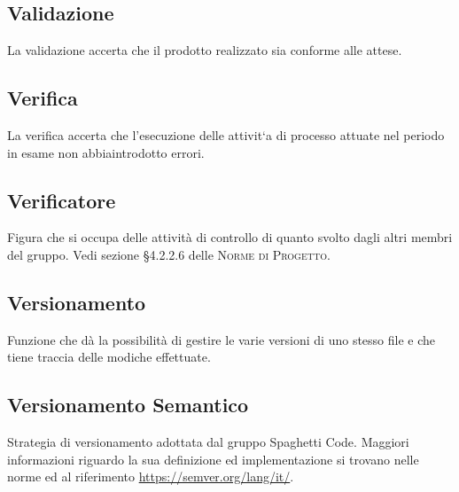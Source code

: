 \documentclass[../glossario.tex]{subfiles}
\begin{document}
\subsection*{Validazione}
{}
La validazione accerta che il prodotto realizzato sia conforme alle attese.

\subsection*{Verifica}
{}
La verifica accerta che l’esecuzione delle attivit`a di processo attuate nel periodo in esame non abbiaintrodotto errori.

\subsection*{Verificatore}
{}
Figura che si occupa delle attività di controllo di quanto svolto dagli altri membri del gruppo. Vedi sezione \S4.2.2.6 delle \textsc{Norme di Progetto}.

\subsection*{Versionamento}
{}
Funzione che dà la possibilità di gestire le varie versioni di uno stesso file e che tiene traccia delle modiche effettuate.

\subsection*{Versionamento Semantico}
{}
Strategia di versionamento adottata dal gruppo Spaghetti Code. Maggiori informazioni riguardo la sua definizione ed implementazione si trovano nelle norme ed al riferimento \url{https://semver.org/lang/it/}.
\end{document}
